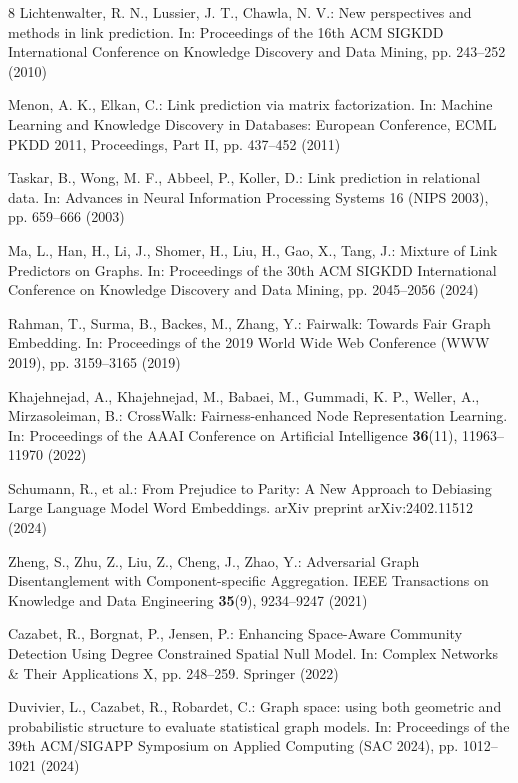 \begin{thebibliography}{8}
Lichtenwalter, R. N., Lussier, J. T., Chawla, N. V.: New perspectives and methods in link prediction. In: Proceedings of the 16th ACM SIGKDD International Conference on Knowledge Discovery and Data Mining, pp. 243--252 (2010)

Menon, A. K., Elkan, C.: Link prediction via matrix factorization. In: Machine Learning and Knowledge Discovery in Databases: European Conference, ECML PKDD 2011, Proceedings, Part II, pp. 437--452 (2011)

Taskar, B., Wong, M. F., Abbeel, P., Koller, D.: Link prediction in relational data. In: Advances in Neural Information Processing Systems 16 (NIPS 2003), pp. 659--666 (2003)

Ma, L., Han, H., Li, J., Shomer, H., Liu, H., Gao, X., Tang, J.: Mixture of Link Predictors on Graphs. In: Proceedings of the 30th ACM SIGKDD International Conference on Knowledge Discovery and Data Mining, pp. 2045--2056 (2024)

Rahman, T., Surma, B., Backes, M., Zhang, Y.: Fairwalk: Towards Fair Graph Embedding. In: Proceedings of the 2019 World Wide Web Conference (WWW 2019), pp. 3159--3165 (2019)

Khajehnejad, A., Khajehnejad, M., Babaei, M., Gummadi, K. P., Weller, A., Mirzasoleiman, B.: CrossWalk: Fairness-enhanced Node Representation Learning. In: Proceedings of the AAAI Conference on Artificial Intelligence \textbf{36}(11), 11963--11970 (2022)

Schumann, R., et al.: From Prejudice to Parity: A New Approach to Debiasing Large Language Model Word Embeddings. arXiv preprint arXiv:2402.11512 (2024)

Zheng, S., Zhu, Z., Liu, Z., Cheng, J., Zhao, Y.: Adversarial Graph Disentanglement with Component-specific Aggregation. IEEE Transactions on Knowledge and Data Engineering \textbf{35}(9), 9234--9247 (2021)

Cazabet, R., Borgnat, P., Jensen, P.: Enhancing Space-Aware Community Detection Using Degree Constrained Spatial Null Model. In: Complex Networks \& Their Applications X, pp. 248--259. Springer (2022)

Duvivier, L., Cazabet, R., Robardet, C.: Graph space: using both geometric and probabilistic structure to evaluate statistical graph models. In: Proceedings of the 39th ACM/SIGAPP Symposium on Applied Computing (SAC 2024), pp. 1012--1021 (2024)


\end{thebibliography}
